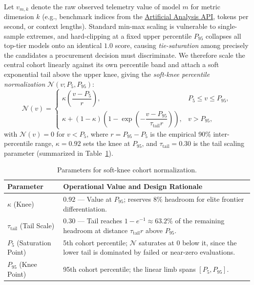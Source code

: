 \documentclass[pdflatex,sn-mathphys-num]{sn-jnl}
\theoremstyle{thmstyleone}
\theoremstyle{thmstylethree}
\begin{document}
Let $v_{m, k}$ denote the raw observed telemetry value of model $m$ for metric dimension $k$ (e.g., benchmark indices from the \href{https://artificialanalysis.ai/api-reference}{Artificial Analysis API}, tokens per second, or context lengths). Standard min-max scaling is vulnerable to single-sample extremes, and hard-clipping at a fixed upper percentile $P_{95}$ collapses all top-tier models onto an identical $1.0$ score, causing \emph{tie-saturation} among precisely the candidates a procurement decision must discriminate. We therefore scale the central cohort linearly against its own percentile band and attach a soft exponential tail above the upper knee, giving the \emph{soft-knee percentile normalization} $\mathcal{N}(v; P_5, P_{95})$:
\begin{equation}\label{eq:normalization}
\mathcal{N}(v) = \begin{cases}
\kappa \left( \dfrac{v - P_5}{r} \right), & P_5 \le v \le P_{95}, \\[8pt]
\kappa + (1 - \kappa) \left( 1 - \exp\left( -\dfrac{v - P_{95}}{\tau_{\mathrm{tail}} r} \right) \right), & v > P_{95},
\end{cases}
\end{equation}
with $\mathcal{N}(v) = 0$ for $v < P_5$, where $r = P_{95} - P_5$ is the empirical 90\% inter-percentile range, $\kappa = 0.92$ sets the knee at $P_{95}$, and $\tau_{\mathrm{tail}} = 0.30$ is the tail scaling parameter (summarized in Table~\ref{tab:norm_params}).

\begin{table}[!htbp]
\caption{Parameters for soft-knee cohort normalization.}\label{tab:norm_params}
\centering
\small
\begin{tabularx}{\linewidth}{@{}p{2.4cm}X@{}}
\toprule
\textbf{Parameter} & \textbf{Operational Value and Design Rationale} \\
\midrule
$\kappa$ (Knee) & $0.92$ --- Value at $P_{95}$; reserves $8\%$ headroom for elite frontier differentiation. \\
$\tau_{\mathrm{tail}}$ (Tail Scale) & $0.30$ --- Tail reaches $1 - e^{-1} \approx 63.2\%$ of the remaining headroom at distance $\tau_{\mathrm{tail}} r$ above $P_{95}$. \\
$P_5$ (Saturation Point) & 5th cohort percentile; $\mathcal{N}$ saturates at $0$ below it, since the lower tail is dominated by failed or near-zero evaluations. \\
$P_{95}$ (Knee Point) & 95th cohort percentile; the linear limb spans $[P_5, P_{95}]$. \\
\bottomrule
\end{tabularx}
\end{table}
\end{document}

